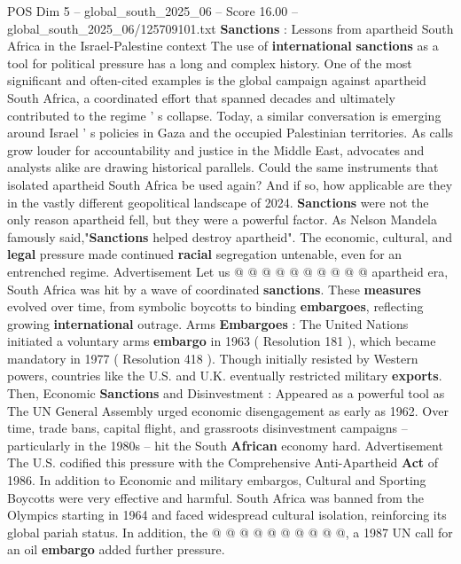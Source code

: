 \begin{textsample}{POS Dim 5 – global\_south\_2025\_06 – Score 16.00 – global\_south\_2025\_06/125709101.txt}  \label{ex:f5_pos_059}
\textbf{Sanctions} : Lessons from apartheid South Africa in the Israel-Palestine context The use of \textbf{international} \textbf{sanctions} as a tool for political pressure has a long and complex history.
One of the most significant and often-cited examples is the global campaign against apartheid South Africa, a coordinated effort that spanned decades and ultimately contributed to the regime ' s collapse.
Today, a similar conversation is emerging around Israel ' s policies in Gaza and the occupied Palestinian territories.
As calls grow louder for accountability and justice in the Middle East, advocates and analysts alike are drawing historical parallels.
Could the same instruments that isolated apartheid South Africa be used again?
And if so, how applicable are they in the vastly different geopolitical landscape of 2024. \textbf{Sanctions} were not the only reason apartheid fell, but they were a powerful factor.
As Nelson Mandela famously said,"\textbf{Sanctions} helped destroy apartheid".
The economic, cultural, and \textbf{legal} pressure made continued \textbf{racial} segregation untenable, even for an entrenched regime.
Advertisement Let us @ @ @ @ @ @ @ @ @ @ apartheid era, South Africa was hit by a wave of coordinated \textbf{sanctions}.
These \textbf{measures} evolved over time, from symbolic boycotts to binding \textbf{embargoes}, reflecting growing \textbf{international} outrage.
Arms \textbf{Embargoes} : The United Nations initiated a voluntary arms \textbf{embargo} in 1963 ( Resolution 181 ), which became mandatory in 1977 ( Resolution 418 ).
Though initially resisted by Western powers, countries like the U.S. and U.K. eventually restricted military \textbf{exports}.
Then, Economic \textbf{Sanctions} and Disinvestment : Appeared as a powerful tool as The UN General Assembly urged economic disengagement as early as 1962.
Over time, trade bans, capital flight, and grassroots disinvestment campaigns -- particularly in the 1980s -- hit the South \textbf{African} economy hard.
Advertisement The U.S. codified this pressure with the Comprehensive Anti-Apartheid \textbf{Act} of 1986.
In addition to Economic and military embargos, Cultural and Sporting Boycotts were very effective and harmful.
South Africa was banned from the Olympics starting in 1964 and faced widespread cultural isolation, reinforcing its global pariah status.
In addition, the @ @ @ @ @ @ @ @ @ @, a 1987 UN call for an oil \textbf{embargo} added further pressure.

\end{textsample}
